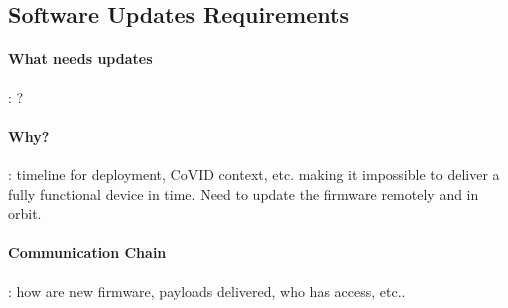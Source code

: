 \subsection{Software Updates Requirements}
\paragraph*{What needs updates}: ?
\paragraph*{Why?}: timeline for deployment, CoVID context, etc. making it impossible
to deliver a fully functional device in time. Need to update the firmware remotely
and in orbit.
\paragraph*{Communication Chain}: how are new firmware, payloads delivered,
who has access, etc..

